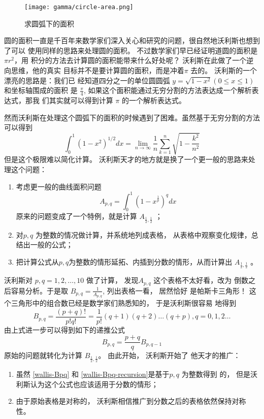 \begin{figure}[htbp]
\centering
\texttt{[image: gamma/circle-area.png]}
\caption{求圆弧下的面积}
\end{figure}

圆的面积一直是千百年来数学家们深入关心和研究的问题，很自然地沃利斯也想到了可以
使用同样的思路来处理圆的面积。 不过数学家们早已经证明道圆的面积是 $\pi r^2$，用
积分的方法去计算圆的面积能带来什么好处呢？ 沃利斯在此做了一个逆向思维，他的真实
目标并不是要计算圆的面积，而是冲着$\pi$ 去的。 沃利斯的一个漂亮的思路是：我们已
经知道四分之一的单位圆圆弧 $y=\sqrt{1-x^2} (0 \le x \le 1)$ 和坐标轴围成的面积
是 $\frac{\pi}{4}$, 如果这个面积能通过无穷分割的方法表达成一个解析表达式，那我
们其实就可以得到计算 $\pi$ 的一个解析表达式。

然而沃利斯在处理这个圆弧下的面积的时候遇到了困难。虽然基于无穷分割的方法可以得到 
$$ \int_0^1 (1-x^2)^{1/2} dx = \lim_{n\rightarrow \infty} \frac{1}{n} \sum^n_{k=1} \sqrt{1-\frac{k^2}{n^2}}$$ 
但是这个极限难以简化计算。 沃利斯天才的地方就是换了一个更一般的思路来处理这个问题：
\begin{enumerate}
\item 考虑更一般的曲线面积问题
$$ A_{p,q} = \int_0^1 (1-x^\frac{1}{p})^q dx$$ 
原来的问题变成了一个特例，就是计算 $A_{\frac{1}{2},\frac{1}{2}}$ ；

\item 对$p,q$ 为整数的情况做计算，并系统地列成表格， 从表格中观察变化规律，总结出一般的公式；
\item 把计算公式从$p,q$为整数的情形延拓、内插到分数的情形，从而计算出
$A_{\frac{1}{2},\frac{1}{2}}$ 。
\end{enumerate}

沃利斯对 $p,q = 1,2,\ldots,10$ 做了计算， 发现$A_{p,q}$ 这个表格不太好看，改为
倒数之后容易分析。于是取 $B_{p,q} = \frac{1}{A_{p,q}}$, 列出表格一看， 居然恰好
是帕斯卡三角形！ 这个三角形中的组合数已经是数学家们熟悉知的， 于是沃利斯很容易
地得到
\begin{equation}
\label{wallis-Bpq}
B_{p,q} = \frac{(p+q)!} {p! q!} = \frac{1}{p!} (q+1) (q+2) \ldots (q+p), q=0,1,2 \ldots
\end{equation}
由上式进一步可以得到如下的递推公式
\begin{equation}
\label{wallis-Bpq-recursion}
B_{p,q} = \frac{p+q}{q} B_{p,q-1}
\end{equation}
原始的问题就转化为计算 $B_{\frac{1}{2},\frac{1}{2}}$。 由此开始， 沃利斯开始了
他天才的推广：
\begin{enumerate}
\item 虽然 \eqref{wallis-Bpq} 和 \eqref{wallis-Bpq-recursion}是基于$p,q$ 为整数得到
的， 但是沃利斯认为这个公式也应该适用于分数的情形；
\item 由于原始表格是对称的， 沃利斯相信推广到分数之后的表格依然保持对称性。
\end{enumerate}

